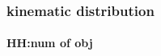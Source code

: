 \documentclass[usenames,dvipsnames]{beamer}
\begin{document}
\begin{frame}
\frametitle{kinematic distribution}
\framesubtitle{HH:num of obj}
%     


\end{frame}
\end{document}
